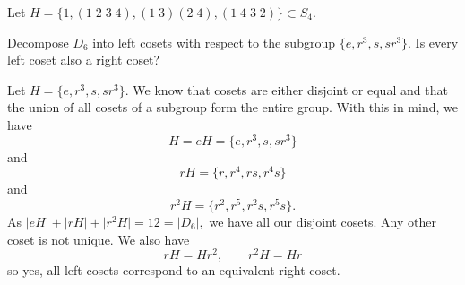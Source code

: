 \question Let 
$H = \{1, (1\;2\;3\;4), (1\;3)(2\;4), (1\;4\;3\;2)\} \subset S_4$.

\setcounter{question}{23}
\question Decompose $D_6$ into left cosets with respect to
the subgroup
$\{e, r^3, s, sr^3\}$.
Is every left coset also a right coset?
\begin{solution}
    Let $H = \{e, r^3, s, sr^3\}$.
    We know that cosets are either disjoint or equal and that
    the union of all cosets of a subgroup form the entire group.
    With this in mind, we have
    \[
        H = eH = \{e, r^3, s, sr^3\}
    \]
    and
    \[
        rH = \{r, r^4, rs, r^4s\}
    \]
    and
    \[
        r^2H = \{r^2,r^5,r^2s,r^5s\}.
    \]
    As 
    $
        \lvert eH \rvert + \lvert rH \rvert + \lvert r^2H \rvert 
        = 12 = \lvert D_6 \rvert,
    $
    we have all our disjoint cosets.
    Any other coset is not unique.
    We also have
    \[
        rH = Hr^2, \qquad r^2H = Hr
    \]
    so yes, all left cosets correspond to an equivalent right coset.
\end{solution}
